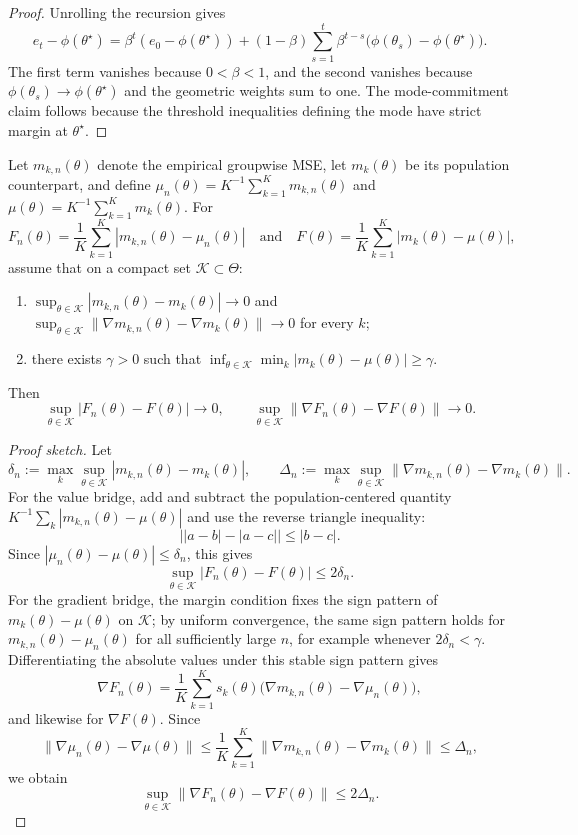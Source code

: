 \begin{proof}
Unrolling the recursion gives
\[
e_t-\phi(\theta^\star)
=
\beta^t(e_0-\phi(\theta^\star))
+(1-\beta)\sum_{s=1}^t \beta^{t-s}\bigl(\phi(\theta_s)-\phi(\theta^\star)\bigr).
\]
The first term vanishes because $0<\beta<1$, and the second vanishes because
$\phi(\theta_s)\to\phi(\theta^\star)$ and the geometric weights sum to one.
The mode-commitment claim follows because the threshold inequalities defining the mode
have strict margin at $\theta^\star$.
\end{proof}

\begin{lemma}
\label{lem:alignmo-bridge}
Let $m_{k,n}(\theta)$ denote the empirical groupwise MSE, let
$m_k(\theta)$ be its population counterpart, and define
$\mu_n(\theta)=K^{-1}\sum_{k=1}^K m_{k,n}(\theta)$ and
$\mu(\theta)=K^{-1}\sum_{k=1}^K m_k(\theta)$.
For
\[
F_n(\theta)=\frac1K\sum_{k=1}^K |m_{k,n}(\theta)-\mu_n(\theta)|
\quad\text{and}\quad
F(\theta)=\frac1K\sum_{k=1}^K |m_k(\theta)-\mu(\theta)|,
\]
assume that on a compact set $\mathcal K\subset\Theta$:
\begin{enumerate}
\item $\sup_{\theta\in\mathcal K}|m_{k,n}(\theta)-m_k(\theta)|\to 0$ and
      $\sup_{\theta\in\mathcal K}\|\nabla m_{k,n}(\theta)-\nabla m_k(\theta)\|\to 0$
      for every $k$;
\item there exists $\gamma>0$ such that
      $\inf_{\theta\in\mathcal K}\min_k |m_k(\theta)-\mu(\theta)|\ge \gamma$.
\end{enumerate}
Then
\[
\sup_{\theta\in\mathcal K}|F_n(\theta)-F(\theta)|\to 0,
\qquad
\sup_{\theta\in\mathcal K}\|\nabla F_n(\theta)-\nabla F(\theta)\|\to 0.
\]
\end{lemma}

\begin{proof}[Proof sketch]
Let
\[
\delta_n := \max_k \sup_{\theta\in\mathcal K}|m_{k,n}(\theta)-m_k(\theta)|,
\qquad
\Delta_n := \max_k \sup_{\theta\in\mathcal K}\|\nabla m_{k,n}(\theta)-\nabla m_k(\theta)\|.
\]
For the value bridge, add and subtract the population-centered quantity
$K^{-1}\sum_k |m_{k,n}(\theta)-\mu(\theta)|$ and use the reverse triangle inequality:
\[
\bigl||a-b|-|a-c|\bigr|\le |b-c|.
\]
Since $|\mu_n(\theta)-\mu(\theta)|\le \delta_n$, this gives
\[
\sup_{\theta\in\mathcal K}|F_n(\theta)-F(\theta)| \le 2\delta_n.
\]
For the gradient bridge, the margin condition fixes the sign pattern of
$m_k(\theta)-\mu(\theta)$ on $\mathcal K$; by uniform convergence, the same sign pattern
holds for $m_{k,n}(\theta)-\mu_n(\theta)$ for all sufficiently large $n$, for example whenever
$2\delta_n<\gamma$.
Differentiating the absolute values under this stable sign pattern gives
\[
\nabla F_n(\theta)
=\frac1K\sum_{k=1}^K s_k(\theta)\bigl(\nabla m_{k,n}(\theta)-\nabla \mu_n(\theta)\bigr),
\]
and likewise for $\nabla F(\theta)$. Since
\[
\|\nabla \mu_n(\theta)-\nabla \mu(\theta)\|
\le
\frac1K\sum_{k=1}^K\|\nabla m_{k,n}(\theta)-\nabla m_k(\theta)\|
\le \Delta_n,
\]
we obtain
\[
\sup_{\theta\in\mathcal K}\|\nabla F_n(\theta)-\nabla F(\theta)\| \le 2\Delta_n.
\]
\end{proof}

